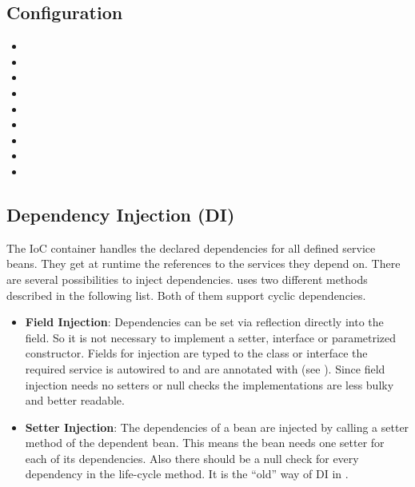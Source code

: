 \subsection{Configuration}
\begin{itemize}
	\item {}
	\item {}
	\item {}
	\item {}
	\item {}
	\item {}
	\item {}
	\item {}
	\item {}
\end{itemize}

\subsection{Dependency Injection (DI)}
\label{module:IoC:DependencyInjection}
The IoC container handles the declared dependencies for all defined service beans. They get at runtime the references to the services they depend on. There are several possibilities to inject dependencies. \AMBETH{} uses two different methods described in the following list. Both of them support cyclic dependencies.

\begin{itemize}
	\item \textbf{Field Injection}: Dependencies can be set via reflection directly into the field. So it is not necessary to implement a setter, interface or parametrized constructor. Fields for injection are typed to the class or interface the required service is autowired to and are annotated with  (see ). Since field injection needs no setters or null checks the implementations are less bulky and better readable.
	\item \textbf{Setter Injection}: The dependencies of a bean are injected by calling a setter method of the dependent bean. This means the bean needs one setter for each of its dependencies. Also there should be a null check for every dependency in the  life-cycle method. It is the ``old'' way of DI in \AMBETH{}.
\end{itemize}	


